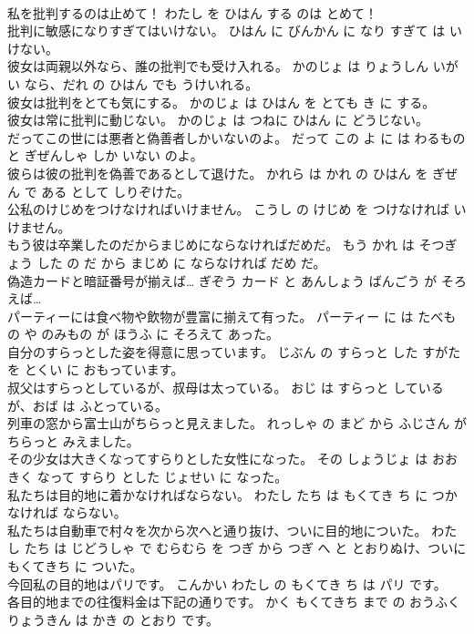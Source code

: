 \documentclass[8pt]{extreport}
\begin{document}
\begin{CJK}{UTF8}{min}
\\	私を批判するのは止めて！	わたし を ひはん する のは とめて！	
\\	批判に敏感になりすぎてはいけない。	ひはん に びんかん に なり すぎて は いけない。	
\\	彼女は両親以外なら、誰の批判でも受け入れる。	かのじょ は りょうしん いがい なら、だれ の ひはん でも うけいれる。	
\\	彼女は批判をとても気にする。	かのじょ は ひはん を とても き に する。	
\\	彼女は常に批判に動じない。	かのじょ は つねに ひはん に どうじない。	
\\	だってこの世には悪者と偽善者しかいないのよ。	だって この よ に は わるもの と ぎぜんしゃ しか いない のよ。	
\\	彼らは彼の批判を偽善であるとして退けた。	かれら は かれ の ひはん を ぎぜん で ある として しりぞけた。	
\\	公私のけじめをつけなければいけません。	こうし の けじめ を つけなければ いけません。	
\\	もう彼は卒業したのだからまじめにならなければだめだ。	もう かれ は そつぎょう した の だ から まじめ に ならなければ だめ だ。	
\\	偽造カードと暗証番号が揃えば…	ぎぞう カード と あんしょう ばんごう が そろえば…	
\\	パーティーには食べ物や飲物が豊富に揃えて有った。	パーティー に は たべもの や のみもの が ほうふ に そろえて あった。	
\\	自分のすらっとした姿を得意に思っています。	じぶん の すらっと した すがた を とくい に おもっています。	
\\	叔父はすらっとしているが、叔母は太っている。	おじ は すらっと しているが、おば は ふとっている。	
\\	列車の窓から富士山がちらっと見えました。	れっしゃ の まど から ふじさん が ちらっと みえました。	
\\	その少女は大きくなってすらりとした女性になった。	その しょうじょ は おおきく なって すらり とした じょせい に なった。	
\\	私たちは目的地に着かなければならない。	わたし たち は もくてき ち に つかなければ ならない。	
\\	私たちは自動車で村々を次から次へと通り抜け、ついに目的地についた。	わたし たち は じどうしゃ で むらむら を つぎ から つぎ へ と とおりぬけ、ついに もくてきち に ついた。	
\\	今回私の目的地はパリです。	こんかい わたし の もくてき ち は パリ です。	
\\	各目的地までの往復料金は下記の通りです。	かく もくてきち まで の おうふく りょうきん は かき の とおり です。	

\end{CJK}
\end{document}
